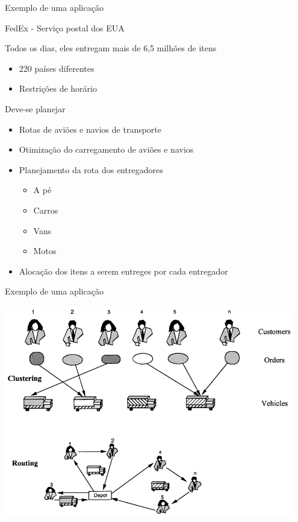 \documentclass[compress]{beamer}
\begin{document}
\begin{frame}{Exemplo de uma aplicação}

FedEx - Serviço postal dos EUA 

Todos os dias, eles entregam mais de 6,5 milhões de itens
\begin{itemize}
    \item 220 países diferentes
    \item Restrições de horário 
\end{itemize}

Deve-se planejar
\begin{itemize}
    \item Rotas de aviões e navios de transporte
    \item Otimização do carregamento de aviões e navios
    \item Planejamento da rota dos entregadores
    \begin{itemize}
        \item A pé
        \item Carros
        \item Vans
        \item Motos
    \end{itemize}
    \item Alocação dos itens a serem entreges por cada entregador
\end{itemize}
\end{frame}


\begin{frame}{Exemplo de uma aplicação}

\centering \includegraphics[width=0.95\textwidth]{images/roteamento.png}
\end{frame}
\end{document}
